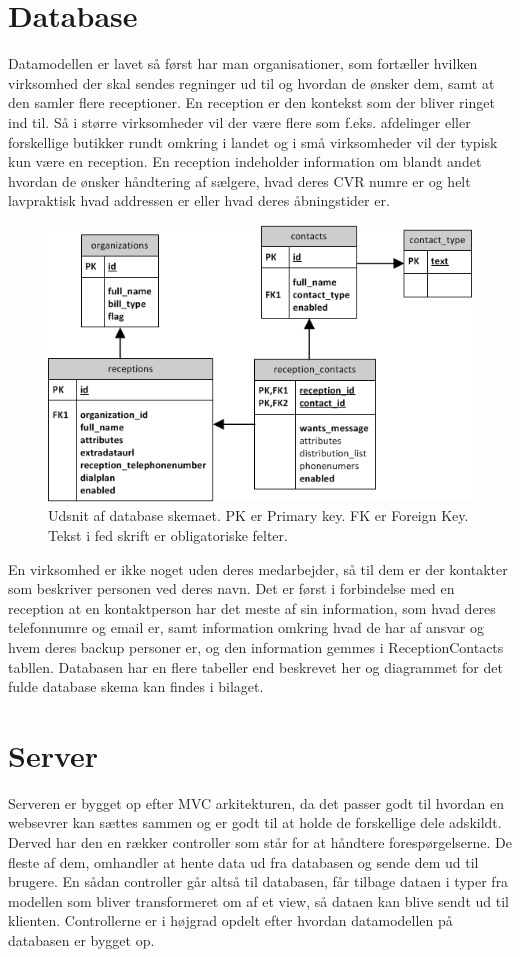 \section{Database}
Datamodellen er lavet så først har man organisationer, som fortæller hvilken virksomhed der skal sendes regninger ud til og hvordan de ønsker dem, samt at den samler flere receptioner. En reception er den kontekst som der bliver ringet ind til. Så i større virksomheder vil der være flere som f.eks. afdelinger eller forskellige butikker rundt omkring i landet og i små virksomheder vil der typisk kun være en reception. En reception indeholder information om blandt andet hvordan de ønsker håndtering af sælgere, hvad deres CVR numre er og helt lavpraktisk hvad addressen er eller hvad deres åbningstider er. 
\begin{figure}[ht!]
\centering
\includegraphics[scale=0.7]{images/ER_Basic.png}
\caption{Udsnit af database skemaet. PK er Primary key. FK er Foreign Key. Tekst i fed skrift er obligatoriske felter.}
\label{fig:erbasic}
\end{figure}

En virksomhed er ikke noget uden deres medarbejder, så til dem er der kontakter som beskriver personen ved deres navn. Det er først i forbindelse med en reception at en kontaktperson har det meste af sin information, som hvad deres telefonnumre og email er, samt information omkring hvad de har af ansvar og hvem deres backup personer er, og den information gemmes i ReceptionContacts tabllen.
Databasen har en flere tabeller end beskrevet her og diagrammet for det fulde database skema kan findes i bilaget.

\section{Server}
Serveren er bygget op efter MVC arkitekturen, da det passer godt til hvordan en websevrer kan sættes sammen og er godt til at holde de forskellige dele adskildt. Derved har den en rækker controller som står for at håndtere forespørgelserne. De fleste af dem, omhandler at hente data ud fra databasen og sende dem ud til brugere. En sådan controller går altså til databasen, får tilbage dataen i typer fra modellen som bliver transformeret om af et view, så dataen kan blive sendt ud til klienten.
Controllerne er i højgrad opdelt efter hvordan datamodellen på databasen er bygget op. 

